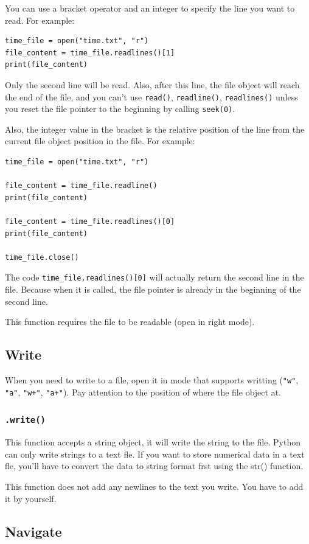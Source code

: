 \documentclass[12pt]{book}
\begin{document}
You can use a bracket operator and an integer to specify the line you want to read. For example:
\begin{verbatim}
time_file = open("time.txt", "r")
file_content = time_file.readlines()[1]
print(file_content)
\end{verbatim}
Only the second line will be read. Also, after this line, the file object will reach the end of the file, and you can't use \texttt{read()}, \texttt{readline()}, \texttt{readlines()} unless you reset the file pointer to the beginning by calling \texttt{seek(0)}.

Also, the integer value in the bracket is the relative position of the line from the current file object position in the file. For example:
\begin{verbatim}
time_file = open("time.txt", "r")

file_content = time_file.readline()
print(file_content)

file_content = time_file.readlines()[0]
print(file_content)

time_file.close()
\end{verbatim}
The code \texttt{time\_file.readlines()[0]} will actually return the second line in the file. Because when it is called, the file pointer is already in the beginning of the second line.

This function requires the file to be readable (open in right mode).
\subsection{Write}
\label{sec:org2997bf7}
When you need to write to a file, open it in mode that supports writting (\texttt{"w"}, \texttt{"a"}, \texttt{"w+"}, \texttt{"a+"}). Pay attention to the position of where the file object at.
\subsubsection{\texttt{.write()}}
\label{sec:orgefa1946}
This function accepts a string object, it will write the string to the file. Python can only write strings to a text fle. If you want to store numerical data in a text fle, you’ll have to convert the data to string format frst using the str() function.

This function does not add any newlines to the text you write. You have to add it by yourself.
\subsection{Navigate}
\label{sec:org88098af}
\end{document}
